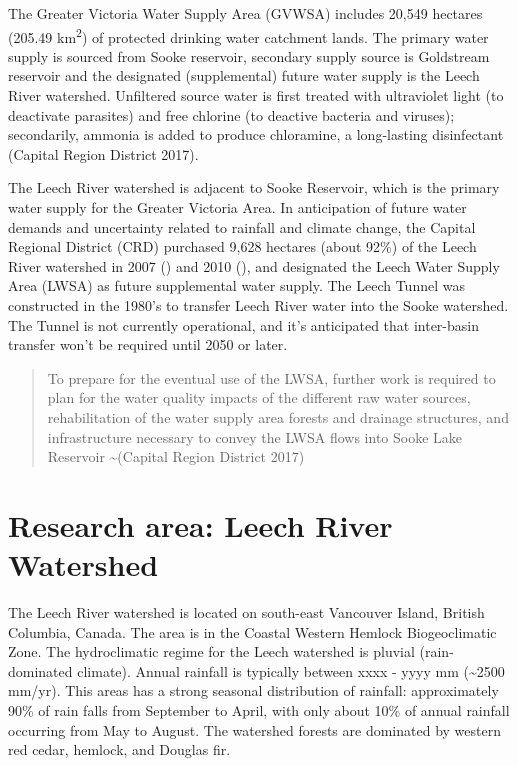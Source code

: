 \documentclass[]{article}
\begin{document}
The Greater Victoria Water Supply Area (GVWSA) includes 20,549 hectares
(205.49 km\textsuperscript{2}) of protected drinking water catchment
lands. The primary water supply is sourced from Sooke reservoir,
secondary supply source is Goldstream reservoir and the designated
(supplemental) future water supply is the Leech River watershed.
Unfiltered source water is first treated with ultraviolet light (to
deactivate parasites) and free chlorine (to deactive bacteria and
viruses); secondarily, ammonia is added to produce chloramine, a
long-lasting disinfectant (Capital Region District 2017).

The Leech River watershed is adjacent to Sooke Reservoir, which is the
primary water supply for the Greater Victoria Area. In anticipation of
future water demands and uncertainty related to rainfall and climate
change, the Capital Regional District (CRD) purchased 9,628 hectares
(about 92\%) of the Leech River watershed in 2007 () and 2010 (), and
designated the Leech Water Supply Area (LWSA) as future supplemental
water supply. The Leech Tunnel was constructed in the 1980's to transfer
Leech River water into the Sooke watershed. The Tunnel is not currently
operational, and it's anticipated that inter-basin transfer won't be
required until 2050 or later.

\begin{quote}
To prepare for the eventual use of the LWSA, further work is required to
plan for the water quality impacts of the different raw water sources,
rehabilitation of the water supply area forests and drainage structures,
and infrastructure necessary to convey the LWSA flows into Sooke Lake
Reservoir \textasciitilde{}(Capital Region District 2017)
\end{quote}

\section{Research area: Leech River
Watershed}\label{research-area-leech-river-watershed}

The Leech River watershed is located on south-east Vancouver Island,
British Columbia, Canada. The area is in the Coastal Western Hemlock
Biogeoclimatic Zone. The hydroclimatic regime for the Leech watershed is
pluvial (rain-dominated climate). Annual rainfall is typically between
xxxx - yyyy mm (\textasciitilde{}2500 mm/yr). This areas has a strong
seasonal distribution of rainfall: approximately 90\% of rain falls from
September to April, with only about 10\% of annual rainfall occurring
from May to August. The watershed forests are dominated by western red
cedar, hemlock, and Douglas fir.
\end{document}
